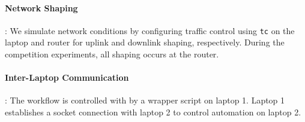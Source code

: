 \paragraph{Network Shaping}: We simulate network conditions by configuring traffic control using \texttt{tc} on the laptop and router for uplink and downlink shaping, respectively. During the competition experiments, all shaping occurs at the router.

\paragraph{Inter-Laptop Communication}: The workflow is controlled with by a wrapper script on laptop 1. Laptop 1 establishes a socket connection with laptop 2 to control automation on laptop 2.
